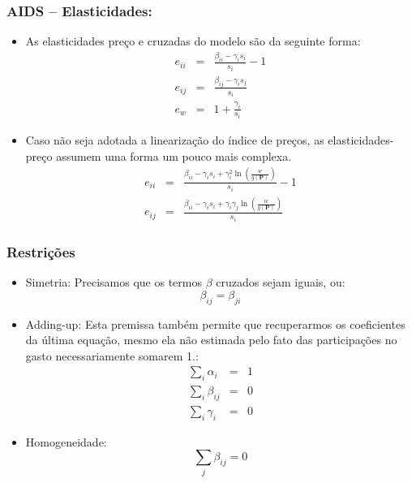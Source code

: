 \documentclass{beamer}
\begin{document}
\begin{frame}\frametitle{AIDS -- Elasticidades:}
\small
\begin{itemize}
\item As elasticidades preço e cruzadas do modelo são da seguinte forma:
\begin{eqnarray*}
e_{ii} & = & \frac{\beta_{ii}-\gamma_{i}s_{i}}{s_{i}}-1\\
e_{ij} & = & \frac{\beta_{ij}-\gamma_{i}s_{j}}{s_{i}}\\
e_{w} & = & 1+\frac{\gamma_{i}}{s_{i}}
\end{eqnarray*}
\item Caso não seja adotada a linearização do índice de preços, as elasticidades-preço
assumem uma forma um pouco mais complexa.
\begin{eqnarray*}
e_{ii} & = & \frac{\beta_{ii}-\gamma_{i}s_{i}+\gamma_{i}^{2}\ln\left(\frac{w}{g(\mathbf{P})}\right)}{s_{i}}-1\\
e_{ij} & = & \frac{\beta_{ii}-\gamma_{i}s_{i}+\gamma_{i}\gamma_{j}\ln\left(\frac{w}{g(\mathbf{P})}\right)}{s_{i}}
\end{eqnarray*}
\end{itemize}
\end{frame}

\begin{frame}[fragile]\frametitle{Restrições}
\small
\begin{itemize}
\item Simetria: Precisamos que os termos $\beta$ cruzados sejam iguais, ou:
\[
\beta_{ij}=\beta_{ji}
\]
\item Adding-up: Esta premissa também permite que recuperarmos os coeficientes da última equação, mesmo ela não
estimada pelo fato das participações no gasto necessariamente somarem 1.:
\begin{eqnarray*}
\sum_{i}\alpha_{i} & = & 1\\
\sum_{i}\beta_{ij} & = & 0\\
\sum_{i}\gamma_{i} & = & 0
\end{eqnarray*}
\item Homogeneidade:
\[
\sum_{j}\beta_{ij}=0
\]
 \end{itemize}   


\end{frame}
\end{document}
